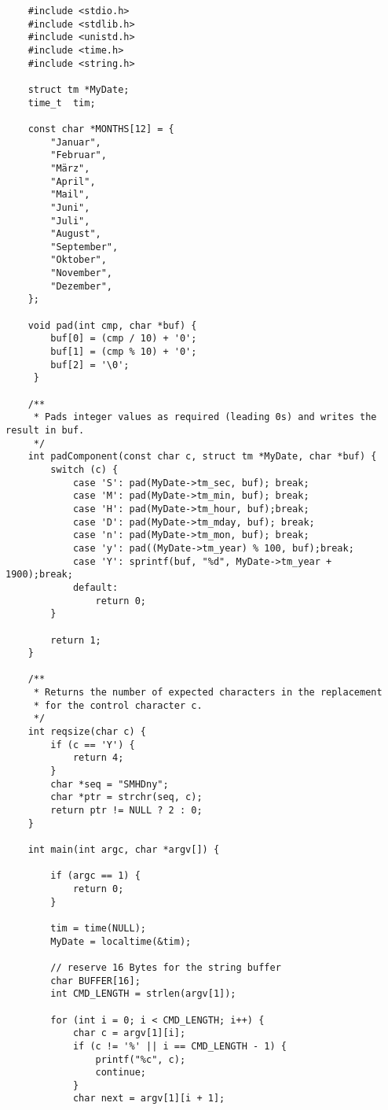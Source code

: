 \begin{verbatim}
    #include <stdio.h>
    #include <stdlib.h>
    #include <unistd.h>
    #include <time.h>
    #include <string.h>

    struct tm *MyDate;
    time_t  tim;

    const char *MONTHS[12] = {
        "Januar",
        "Februar",
        "März",
        "April",
        "Mail",
        "Juni",
        "Juli",
        "August",
        "September",
        "Oktober",
        "November",
        "Dezember",
    };

    void pad(int cmp, char *buf) {
        buf[0] = (cmp / 10) + '0';
        buf[1] = (cmp % 10) + '0';
        buf[2] = '\0';
     }

    /**
     * Pads integer values as required (leading 0s) and writes the result in buf.
     */
    int padComponent(const char c, struct tm *MyDate, char *buf) {
        switch (c) {
            case 'S': pad(MyDate->tm_sec, buf); break;
            case 'M': pad(MyDate->tm_min, buf); break;
            case 'H': pad(MyDate->tm_hour, buf);break;
            case 'D': pad(MyDate->tm_mday, buf); break;
            case 'n': pad(MyDate->tm_mon, buf); break;
            case 'y': pad((MyDate->tm_year) % 100, buf);break;
            case 'Y': sprintf(buf, "%d", MyDate->tm_year + 1900);break;
            default:
                return 0;
        }

        return 1;
    }

    /**
     * Returns the number of expected characters in the replacement
     * for the control character c.
     */
    int reqsize(char c) {
        if (c == 'Y') {
            return 4;
        }
        char *seq = "SMHDny";
        char *ptr = strchr(seq, c);
        return ptr != NULL ? 2 : 0;
    }

    int main(int argc, char *argv[]) {

        if (argc == 1) {
            return 0;
        }

        tim = time(NULL);
        MyDate = localtime(&tim);

        // reserve 16 Bytes for the string buffer
        char BUFFER[16];
        int CMD_LENGTH = strlen(argv[1]);

        for (int i = 0; i < CMD_LENGTH; i++) {
            char c = argv[1][i];
            if (c != '%' || i == CMD_LENGTH - 1) {
                printf("%c", c);
                continue;
            }
            char next = argv[1][i + 1];


\end{verbatim}
